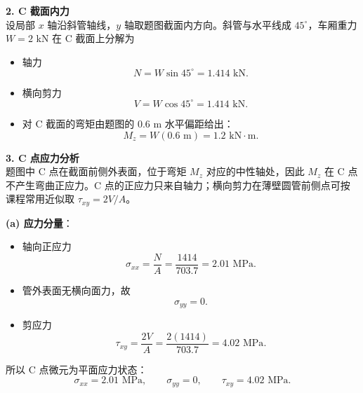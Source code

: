 \documentclass[11pt,a4paper]{ctexrep}
\begin{document}
{\textbf{2. C 截面内力} \\
设局部 $x$ 轴沿斜管轴线，$y$ 轴取题图截面内方向。斜管与水平线成 $45^\circ$，车厢重力 $W=2\text{ kN}$ 在 C 截面上分解为
\begin{itemize}
    \item 轴力
          \[
              N=W\sin45^\circ=1.414\text{ kN}.
          \]
    \item 横向剪力
          \[
              V=W\cos45^\circ=1.414\text{ kN}.
          \]
    \item 对 C 截面的弯矩由题图的 $0.6\text{ m}$ 水平偏距给出：
          \[
              M_z=W(0.6\text{ m})=1.2\text{ kN}\cdot\text{m}.
          \]
\end{itemize}

\textbf{3. C 点应力分析} \\
题图中 C 点在截面前侧外表面，位于弯矩 $M_z$ 对应的中性轴处，因此 $M_z$ 在 C 点不产生弯曲正应力。C 点的正应力只来自轴力；横向剪力在薄壁圆管前侧点可按课程常用近似取 $\tau_{xy}=2V/A$。

\textbf{(a) 应力分量}：
\begin{itemize}
    \item 轴向正应力
          \[
              \sigma_{xx}
              =\frac{N}{A}
              =\frac{1414}{703.7}
              =2.01\text{ MPa}.
          \]
    \item 管外表面无横向面力，故
          \[
              \sigma_{yy}=0 .
          \]
    \item 剪应力
          \[
              \tau_{xy}
              =\frac{2V}{A}
              =\frac{2(1414)}{703.7}
              =4.02\text{ MPa}.
          \]
\end{itemize}
所以 C 点微元为平面应力状态：
\[
    \sigma_{xx}=2.01\text{ MPa},\qquad
    \sigma_{yy}=0,\qquad
    \tau_{xy}=4.02\text{ MPa}.
\]

\begin{center}
\end{center}

}
\end{document}
